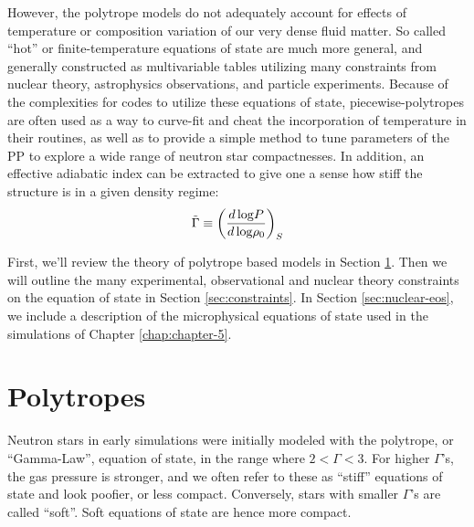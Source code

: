 However, the polytrope models do not adequately account for effects of temperature or composition variation of our very dense fluid matter.  
So called ``hot'' or finite-temperature equations of state are much more general, and generally constructed as multivariable tables utilizing many constraints from nuclear theory, astrophysics observations, and particle experiments.
Because of the complexities for codes to utilize these equations of state, piecewise-polytropes are often used as a way to curve-fit and cheat the incorporation of temperature in their routines, as well as to provide a simple method to tune parameters of the PP to explore a wide range of neutron star compactnesses.
In addition, an effective adiabatic index can be extracted to give one a sense how stiff the structure is in a given density regime:
\begin{align}
\label{e:adiabat}
\tilde{\Gamma} \equiv \left( \frac{d\, {\rm log} P}{d\, {\rm log} \rho_0} \right) _S
\end{align}

First, we'll review the theory of polytrope based models in Section \ref{sec:polytropes}. Then we will outline the many experimental, observational and nuclear theory constraints on the equation of state in Section \ref{sec:constraints}.   In Section \ref{sec:nuclear-eos}, we include a description of the microphysical equations of state used in the simulations of Chapter \ref{chap:chapter-5}. 


\section{Polytropes}
\label{sec:polytropes}

Neutron stars in early simulations were initially modeled with the polytrope, or ``Gamma-Law'', equation of state, in the range where $2 < \Gamma < 3$.
For higher $\Gamma$'s, the gas pressure is stronger, and we often refer to these as ``stiff'' equations of state and look poofier, or less compact.
Conversely, stars with smaller $\Gamma$'s are called ``soft''.  Soft equations of state are hence more compact.

